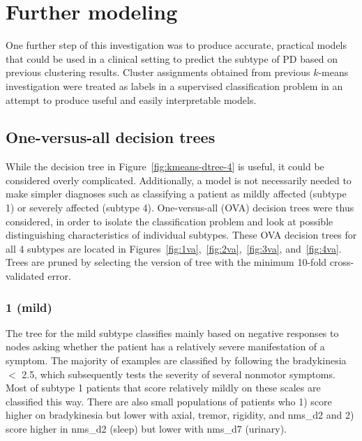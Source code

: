 \documentclass[10pt]{article}
\begin{document}
\section{Further modeling}

One further step of this investigation was to produce accurate, practical
models that could be used in a clinical setting to predict the subtype of PD
based on previous clustering results. Cluster assignments obtained from
previous $k$-means investigation were treated as labels in a supervised
classification problem in an attempt to produce useful and easily interpretable
models.

\subsection{One-versus-all decision trees}
\label{sub:ova}

While the decision tree in Figure~\ref{fig:kmeans-dtree-4} is useful, it could
be considered overly complicated. Additionally, a model is not necessarily
needed to make simpler diagnoses such as classifying a patient as mildly
affected (subtype 1) or severely affected (subtype 4). One-versus-all (OVA)
decision trees were thus considered, in order to isolate the classification
problem and look at possible distinguishing characteristics of individual
subtypes. These OVA decision trees for all 4 subtypes are located in
Figures~\ref{fig:1va},~\ref{fig:2va},~\ref{fig:3va}, and~\ref{fig:4va}. Trees
are pruned by selecting the version of tree with the minimum 10-fold
cross-validated error.

\subsubsection{1 (mild)}
The tree for the mild subtype classifies mainly based on negative responses to
nodes asking whether the patient has a relatively severe manifestation of a
symptom. The majority of examples are classified by following the bradykinesia
$<$ 2.5, which subsequently tests the severity of several nonmotor symptoms.
Most of subtype 1 patients that score relatively mildly on these scales are
classified this way. There are also small populations of patients who 1) score
higher on bradykinesia but lower with axial, tremor, rigidity, and nms\_d2 and
2) score higher in nms\_d2 (sleep) but lower with nms\_d7 (urinary).
\end{document}
